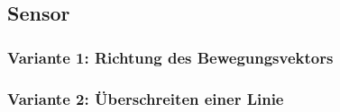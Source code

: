 \subsection{Sensor}\label{ch:Umsetzung_Sensor}

\subsubsection{Variante 1: Richtung des Bewegungsvektors}\label{ch:Sensor_v1}

\subsubsection{Variante 2: Überschreiten einer Linie}\label{ch:Sensor_v2}

